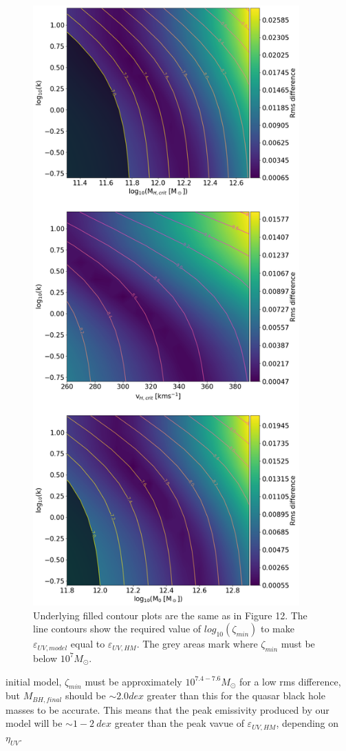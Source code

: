 \documentclass[12pt, twocolumn]{report}%
\begin{document}
\begin{figure}[H]
\centering
\includegraphics[width=10.25cm]{Contour_2.png}
\caption{Underlying filled contour plots are the same as in Figure 12. The line contours show the required value of $log_{10}(\zeta_{min})$ to make $\varepsilon_{UV,model}$ equal to $\varepsilon_{UV,HM}$. The grey areas mark where $\zeta_{min}$ must be below $10^7M_\odot$.}
\label{fig:13}
\end{figure}
\clearpage
\twocolumngrid


\noindent initial model, $\zeta_{min}$ must be approximately $10^{7.4-7.6}M_\odot$ for a low rms difference, but $M_{BH,final}$ should be $\sim2.0dex$ greater than this for the quasar black hole masses to be accurate. This means that the peak emissivity produced by our model will be $\sim1-2\:dex$ greater than the peak vavue of $\varepsilon_{UV,HM}$, depending on $\eta_{UV}$.\par
\end{document}
